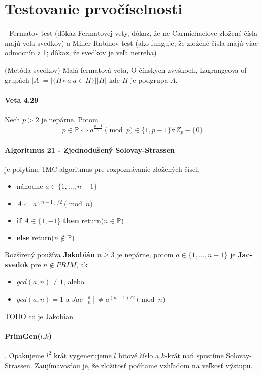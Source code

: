\documentclass[12pt,a4paper]{article}
\begin{document}
\section{Testovanie prvočíselnosti}
\label{sec:prime-test} 
 - Fermatov test (dôkaz Fermatovej vety, dôkaz, že ne-Carmichaelove zložené čísla majú veľa svedkov) a Miller-Rabinov test (ako funguje, že zložené čísla majú viac odmocnín z 1; dôkaz, že svedkov je veľa netreba)

(Metóda svedkov) 
Malá fermatová veta, O čínskych zvyškoch, Lagrangeova of grupách $|A| = |\{H \circ a | a \in H\}||H|$ kde $H$ je podgrupa $A$.  

\paragraph{Veta 4.29} Nech $p > 2$ je nepárne. Potom 
$$
  p \in \mathbb{P} \Leftrightarrow a^{\frac{p-1}{2}} \pmod p \in \{1, p-1\} \forall Z_p - \{0\}
$$

\paragraph{Algoritmus 21 - Zjednodušený Solovay-Strassen} je polytime 1MC algoritmus pre rozpoznávanie zložených čísel. 
\begin{itemize}
  \item náhodne $a \in \{1,\ldots,n-1\}$
  \item $A \Leftarrow a^{(n-1)/2} \pmod n$
  \item {\bf if} $A \in \{1, -1\}$ {\bf then} return($n \in \mathbb{P}$)
  \item {\bf else} return($n \not\in \mathbb{P}$)
\end{itemize} 
Rozšírený používa {\bf Jakobián} $n \geq 3$ je nepárne, potom $a \in \{1,\ldots,n-1\}$ je {\bf Jac-svedok} pre $n \not\in PRIM$, ak 
\begin{itemize} 
  \item $gcd(a,n) \neq 1$, alebo
  \item $gcd(a,n) = 1$ a $Jac[\frac{a}{n}] \neq a^{(n-1)/2} \pmod n$
\end{itemize} 
TODO co je Jakobian 

\paragraph{PrimGen($l$,$k$)}. Opakujeme $l^2$ krát vygenerujeme $l$ bitové číslo a $k$-krát naň spustíme Solovay-Strassen. Zaujímavosťou je, že zložitosť počítame vzhľadom na veľkosť výstupu. 
\end{document}
